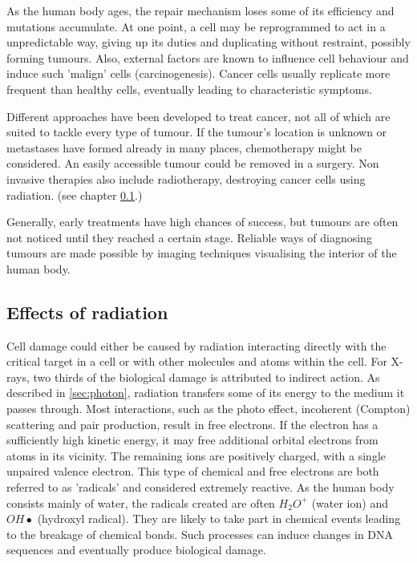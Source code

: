 As the human body ages, the repair mechanism loses some of its efficiency and mutations accumulate.
At one point, a cell may be reprogrammed to act in a unpredictable way, giving up its duties and duplicating without restraint, possibly forming tumours.
Also, external factors are known to influence cell behaviour and induce such 'malign' cells (carcinogenesis).
Cancer cells usually replicate more frequent than healthy cells, eventually leading to characteristic symptoms.

Different approaches have been developed to treat cancer, not all of which are suited to tackle every type of tumour.
If the tumour's location is unknown or metastases have formed already in many places, chemotherapy might be considered.
An easily accessible tumour could be removed in a surgery.
Non invasive therapies also include radiotherapy, destroying cancer cells using radiation. (see chapter \ref{sec:irradiate}.)

Generally, early treatments have high chances of success, but tumours are often not noticed until they reached a certain stage. 
Reliable ways of diagnosing tumours are made possible by imaging techniques visualising the interior of the human body. \cite{Baumann2017, Basic Clinical Radiobiology (4th edition)}

\subsection{Effects of radiation}
\label{sec:irradiate}

Cell damage could either be caused by radiation interacting directly with the critical target in a cell or with other molecules and atoms within the cell.
For X-rays, two thirds of the biological damage is attributed to indirect action.
As described in \ref{sec:photon}, radiation transfers some of its energy to the medium it passes through.
Most interactions, such as the photo effect, incoherent (Compton) scattering and pair production, result in free electrons.
If the electron has a sufficiently high kinetic energy, it may free additional orbital electrons from atoms in its vicinity.
The remaining ions are positively charged, with a single unpaired valence electron.
This type of chemical and free electrons are both referred to as 'radicals' and considered extremely reactive.
As the human body consists mainly of water, the radicals created are often $H_2O^+$ (water ion) and $OH \bullet$ (hydroxyl radical).
They are likely to take part in chemical events leading to the breakage of chemical bonds.
Such processes can induce changes in DNA sequences and eventually produce biological damage. \\

